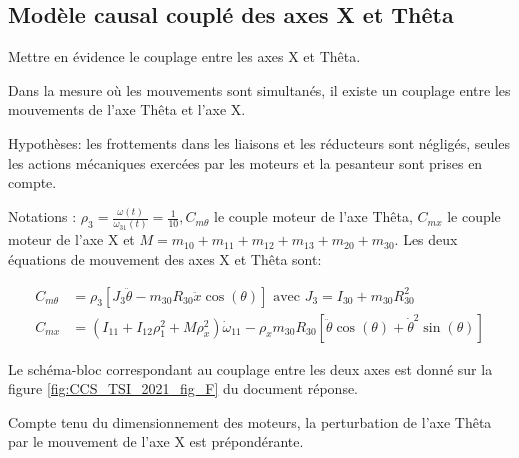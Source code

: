 \subsection{Modèle causal couplé des axes X et Thêta}
\begin{obj}
Mettre en évidence le couplage entre les axes X et Thêta.
\end{obj}
Dans la mesure où les mouvements sont simultanés, il existe un couplage entre les mouvements de l'axe Thêta et l'axe X.

Hypothèses: les frottements dans les liaisons et les réducteurs sont négligés, seules les actions mécaniques exercées par les moteurs et la pesanteur sont prises en compte.

Notations : $\rho_{3}=\frac{\omega(t)}{\omega_{31}(t)}=\frac{1}{10}, C_{m \theta}$ le couple moteur de l'axe Thêta, $C_{m x}$ le couple moteur de l'axe X et $M=m_{10}+m_{11}+m_{12}+m_{13}+m_{20}+m_{30}$. Les deux équations de mouvement des axes X et Thêta sont:


\begin{align*}
C_{m \theta} & =\rho_{3}\left[J_{3} \ddot{\theta}-m_{30} R_{30} \ddot{x} \cos (\theta)\right] \text { avec } J_{3}=I_{30}+m_{30} R_{30}^{2}  \tag{III.1}\\
C_{m x} & =\left(I_{11}+I_{12} \rho_{1}^{2}+M \rho_{x}^{2}\right) \dot{\omega}_{11}-\rho_{x} m_{30} R_{30}\left[\ddot{\theta} \cos (\theta)+\dot{\theta}^{2} \sin (\theta)\right] \tag{III.2}
\end{align*}



Le schéma-bloc correspondant au couplage entre les deux axes est donné sur la figure \ref{fig:CCS_TSI_2021_fig_F} du document réponse.


Compte tenu du dimensionnement des moteurs, la perturbation de l'axe Thêta par le mouvement de l'axe X est prépondérante.


